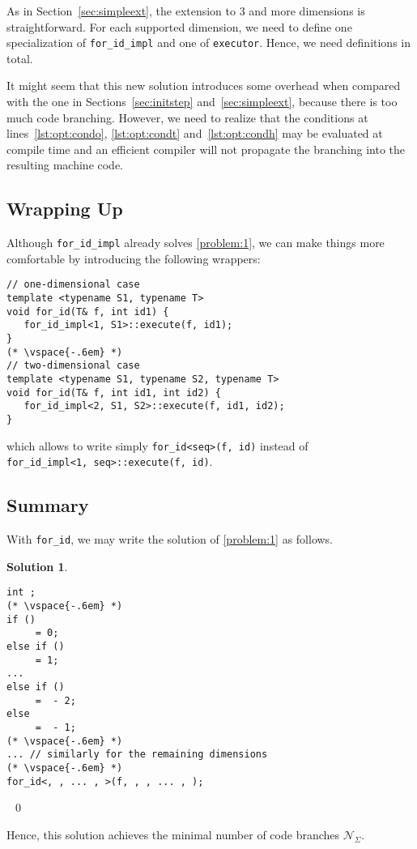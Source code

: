 \documentclass[10pt,a4paper]{article}
\theoremstyle{definition}\newtheorem{problem}{Problem}
\newtheorem{solution}{Solution}
\providecommand{\symcbsum}{\ensuremath{\mathcal{N}_{\Sigma}}\xspace}
\providecommand{\forid}{\texttt{for\_id}\xspace}
\begin{document}
\begin{enumerate}
\end{enumerate}

As in Section~\ref{sec:simpleext}, the extension to 3 and more dimensions is straightforward. For each supported dimension, we need to define one specialization of \verb|for_id_impl| and one of \verb|executor|. Hence, we need  definitions in total.

It might seem that this new solution introduces some overhead when compared with the one in Sections~\ref{sec:initstep} and~\ref{sec:simpleext}, because there is too much code branching. However, we need to realize that the conditions at lines~\ref{lst:opt:condo}, \ref{lst:opt:condt} and~\ref{lst:opt:condh} may be evaluated at compile time and an efficient compiler will not propagate the branching into the resulting machine code.

\subsection{Wrapping Up}

Although \verb|for_id_impl| already solves \autoref{problem:1}, we can make things more comfortable by introducing the following wrappers:
{\small
\begin{lstlisting}
// one-dimensional case
template <typename S1, typename T>
void for_id(T& f, int id1) {
   for_id_impl<1, S1>::execute(f, id1);
}
(* \vspace{-.6em} *)
// two-dimensional case
template <typename S1, typename S2, typename T>
void for_id(T& f, int id1, int id2) {
   for_id_impl<2, S1, S2>::execute(f, id1, id2);
}
\end{lstlisting}
}
\noindent
which allows to write simply \verb|for_id<seq>(f, id)| instead of\\ \verb|for_id_impl<1, seq>::execute(f, id)|.


\subsection{Summary}

With \forid, we may write the solution of \autoref{problem:1} as follows.

\begin{solution}\ \label{solution:2}

\begin{lstlisting}
int ;
(* \vspace{-.6em} *)
if ()
     = 0;
else if ()
     = 1;
...
else if ()
     =  - 2;
else
     =  - 1;
(* \vspace{-.6em} *)
... // similarly for the remaining dimensions
(* \vspace{-.6em} *)
for_id<, , ... , >(f, , , ... , );
\end{lstlisting}

\vspace{-.4em} \ \qed
\end{solution}
\vspace{-.6em}
Hence, this solution achieves the minimal number of code branches \symcbsum. 
\end{document}
